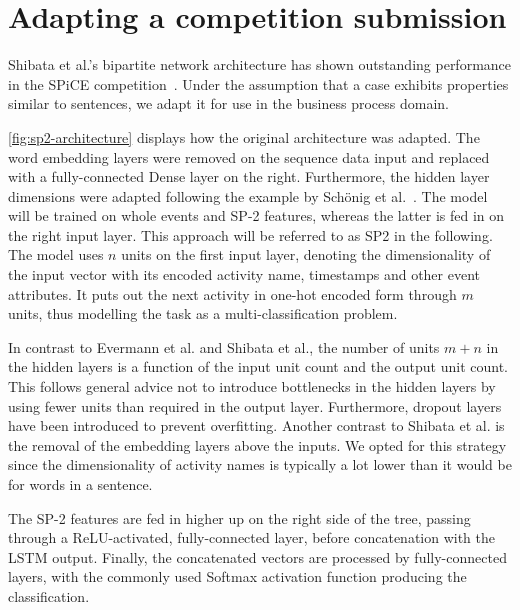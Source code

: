 \section{Adapting a competition submission}
\label{sec:contrib:sp2-inspiration}
Shibata et al.'s bipartite network architecture has shown outstanding performance in the SPiCE competition~\cite{web:spice}. Under the assumption that a case exhibits properties similar to sentences, we adapt it for use in the business process domain. 

\autoref{fig:sp2-architecture} displays how the original architecture was adapted. The word embedding layers were removed on the sequence data input and replaced with a fully-connected Dense layer on the right. Furthermore, the hidden layer dimensions were adapted following the example by Schönig et al.~\cite{schoenig2018}. The model will be trained on whole events and SP-2 features, whereas the latter is fed in on the right input layer. This approach will be referred to as SP2 in the following.\\

The model uses $n$ units on the first input layer, denoting the dimensionality of the input vector with its encoded activity name, timestamps and other event attributes. It puts out the next activity in one-hot encoded form through $m$ units, thus modelling the task as a multi-classification problem.

In contrast to Evermann et al. and Shibata et al., the number of units $m+n$ in the hidden layers is a function of the input unit count and the output unit count. This follows general advice not to introduce bottlenecks in the hidden layers by using fewer units than required in the output layer. Furthermore, dropout layers have been introduced to prevent overfitting. Another contrast to Shibata et al. is the removal of the embedding layers above the inputs. We opted for this strategy since the dimensionality of activity names is typically a lot lower than it would be for words in a sentence.

The SP-2 features are fed in higher up on the right side of the tree, passing through a ReLU-activated, fully-connected layer, before concatenation with the LSTM output. Finally, the concatenated vectors are processed by fully-connected layers, with the commonly used Softmax activation function producing the classification.

